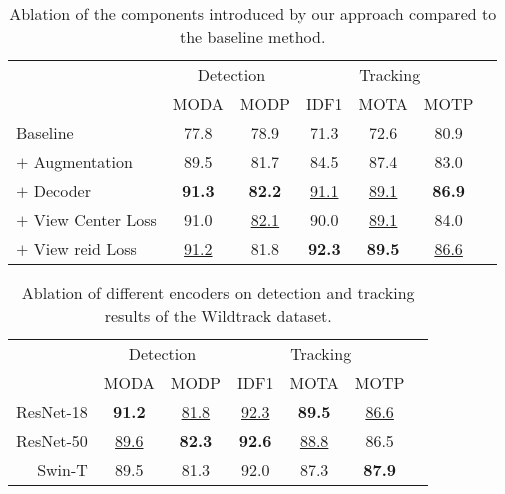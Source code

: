 \documentclass[10pt,twocolumn,letterpaper]{article}
\begin{document}
\begin{table}[t]
\setlength{\tabcolsep}{2.75pt}
\centering
\begin{tabular}{lcccccc}
\toprule
& \multicolumn{2}{c}{Detection} & \multicolumn{3}{c}{Tracking} \\\cmidrule(lr){2-3}\cmidrule(lr){4-6}
& MODA & MODP & IDF1 & MOTA & MOTP  \\
\midrule
\small{Baseline} &  77.8 & 78.9 & 71.3 & 72.6 & 80.9\\  \midrule
$+$ \small{Augmentation}         & 89.5 & 81.7 & 84.5 & 87.4 & 83.0\\
$+$ \small{Decoder}              & \textbf{91.3} & \textbf{82.2} & \underline{91.1} & \underline{89.1} & \textbf{86.9}\\
$+$ \small{View Center Loss}     & 91.0 & \underline{82.1} & 90.0 & \underline{89.1} & 84.0\\
$+$ \small{View \gls{reid} Loss} &\underline{91.2} & 81.8 & \textbf{92.3} & \textbf{89.5} & \underline{86.6}\\
\bottomrule
\end{tabular}
\caption{Ablation of the components introduced by our approach compared to the baseline method.}
\label{tab:model-ablation}
\end{table}
 \begin{table}[t!]
\setlength{\tabcolsep}{2.75pt}
\centering
\begin{tabular}{rcccccc}
\toprule
& \multicolumn{2}{c}{Detection} & \multicolumn{3}{c}{Tracking} \\\cmidrule(lr){2-3}\cmidrule(lr){4-6}
& MODA & MODP & IDF1 & MOTA & MOTP  \\
\midrule
ResNet-18 & \textbf{91.2} & \underline{81.8} & \underline{92.3} & \textbf{89.5} & \underline{86.6} \\
ResNet-50 & \underline{89.6} & \textbf{82.3} & \textbf{92.6} & \underline{88.8} & 86.5 \\
Swin-T   & 89.5 & 81.3 & 92.0 & 87.3 & \textbf{87.9} \\
\bottomrule
\end{tabular}
\caption{Ablation of different encoders on detection and tracking results of the Wildtrack dataset.}
\label{tab:backbone-ablation}
\end{table}
 
\end{document}
